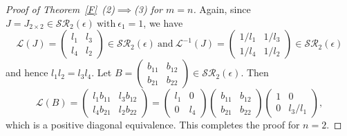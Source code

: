 \documentclass[11pt,reqno]{amsart}
\theoremstyle{plain}
\theoremstyle{definition}
\numberwithin{equation}{section}
\begin{document}
\begin{proof}[Proof of Theorem~\ref{F}~(2)$\implies$(3) for $m=n$]
	Again, since $J=J_{2 \times2}
	\in \mathcal{SR}_2(\epsilon) ~\text{with}~ \epsilon_1=1$,
	we have 
	\[\mathcal{L}(J)=\begin{pmatrix}
		l_{1} & l_{3} \\
		l_{4} & l_{2}
	\end{pmatrix}\in \mathcal{SR}_2(\epsilon)~\text{and}~ \mathcal{L}^{-1}(J)=\begin{pmatrix}
		1/l_1 & 1/l_3 \\
		1/l_4 & 1/l_2
	\end{pmatrix}\in \mathcal{SR}_2(\epsilon) \]
	and hence $l_{1}l_{2} = l_{3}l_{4}$. Let $B=\begin{pmatrix}
		b_{11} & b_{12} \\
		b_{21} & b_{22} 
	\end{pmatrix}\in \mathcal{SR}_2(\epsilon)$. Then
	\[ \mathcal{L}(B)=\begin{pmatrix}
		l_{1}b_{11} & l_{3}b_{12} \\
		l_{4}b_{21} & l_{2}b_{22}
	\end{pmatrix} = \begin{pmatrix}
		l_{1} & 0  \\
		0 & l_{4}
	\end{pmatrix}\begin{pmatrix}
		b_{11} & b_{12} \\
		b_{21} & b_{22} 
	\end{pmatrix}\begin{pmatrix}
		1 & 0  \\
		0 & l_{3}/l_{1}
	\end{pmatrix},\]
	which is a positive diagonal equivalence. This completes the proof for $n=2$.
	

\end{proof}
\end{document}
